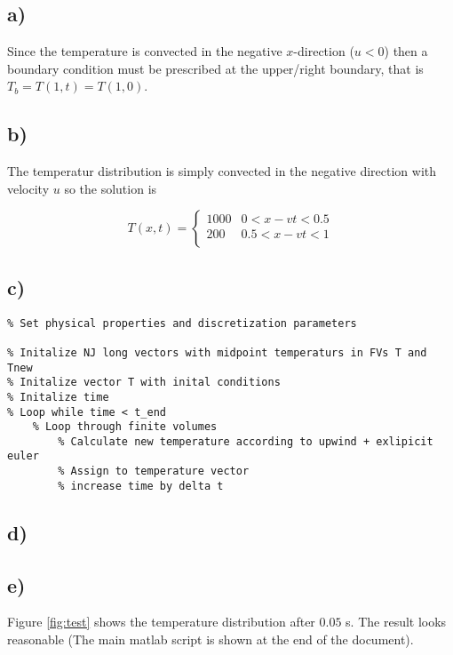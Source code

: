 \documentclass{article}
\begin{document}
\subsection{a)}
Since the temperature is convected in the negative $x$-direction ($u<0$) then a boundary condition must be prescribed at the upper/right boundary, that is $T_b = T(1,t) = T(1,0)$.

\subsection{b)}

The temperatur distribution is simply convected in the negative direction with velocity $u$ so the solution is

\begin{equation}
T(x,t) =
	\begin{cases}
	1000	&0  < x-vt < 0.5 \\
	200 	 & 0.5 < x-vt < 1 \\   
	\end{cases}
\end{equation}

\subsection{c)}

\begin{lstlisting}
% Set physical properties and discretization parameters

% Initalize NJ long vectors with midpoint temperaturs in FVs T and Tnew
% Initalize vector T with inital conditions
% Initalize time 
% Loop while time < t_end
	% Loop through finite volumes
		% Calculate new temperature according to upwind + exlipicit euler
		% Assign to temperature vector 
		% increase time by delta t
\end{lstlisting}

\newpage
\subsection{d)}


\subsection{e)}
Figure \ref{fig:test} shows the temperature distribution after $0.05$ s. The result looks reasonable (The main matlab script is shown at the end of the document).
\end{document}
